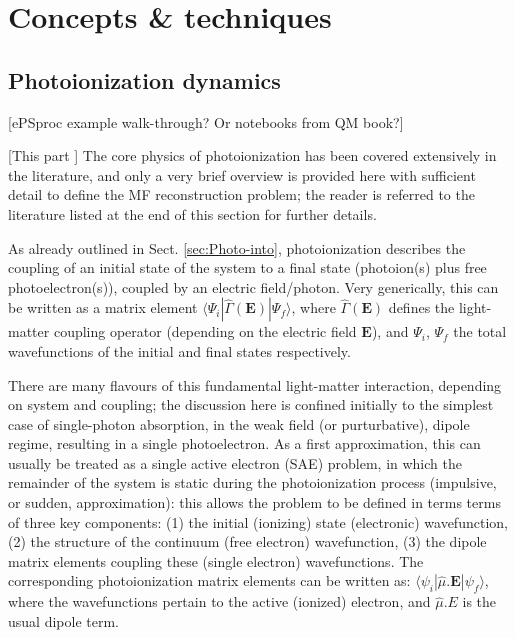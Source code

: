 \section{Concepts \& techniques\label{sec:Concepts}}

\subsection{Photoionization dynamics} 
[ePSproc example walk-through? Or notebooks from QM book?]

[This part ]
The core physics of photoionization has been covered extensively in the literature, and only a very brief overview is provided here with sufficient detail to define the MF reconstruction problem; the reader is referred to the literature listed at the end of this section for further details.

As already outlined in Sect. \ref{sec:Photo-into}, photoionization describes the coupling of an initial state of the system to a final state (photoion(s) plus free photoelectron(s)), coupled by an electric field/photon. Very generically, this can be written as a matrix element $\langle\Psi_i|\hat{\Gamma}(\boldsymbol{\mathbf{E}})|\Psi_f\rangle$, where $\hat{\Gamma}(\boldsymbol{\mathbf{E}})$ defines the light-matter coupling operator (depending on the electric field $\boldsymbol{\mathbf{E}}$), and $\Psi_i$, $\Psi_f$ the total wavefunctions of the initial and final states respectively. 

There are many flavours of this fundamental light-matter interaction, depending on system and coupling; the discussion here is confined initially to the simplest case of single-photon absorption, in the weak field (or purturbative), dipole regime, resulting in a single photoelectron.
As a first approximation, this can usually be treated as a single active electron (SAE) problem, in which the remainder of the system is static during the photoionization process (impulsive, or sudden, approximation): this allows the problem to be defined in terms terms of three key components: (1) the initial (ionizing) state (electronic) wavefunction, (2) the structure of the continuum (free electron) wavefunction, (3) the dipole matrix elements coupling these (single electron) wavefunctions. The corresponding photoionization matrix elements can be written as: $\langle\psi_i|\hat{\mu}.\boldsymbol{\mathbf{E}}|\psi_f\rangle$, where the wavefunctions pertain to the active (ionized) electron, and $\hat{\mu}.E$ is the usual dipole term.

